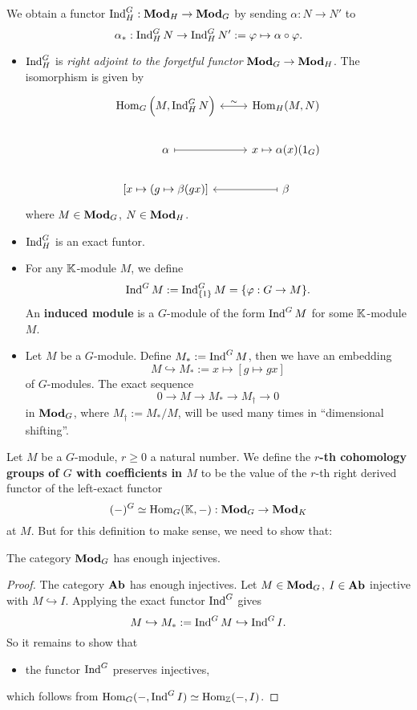 \begin{example}
\begin{enumerate}[(a)]
    We obtain a functor $\operatorname{Ind}_H^G : \mathbf{Mod}_H\to\mathbf{Mod}_G$ by sending $\alpha : N\to N'$ to \[\alpha_* : \operatorname{Ind}_H^G N\to\operatorname{Ind}_H^G N' := \varphi\mapsto\alpha\circ\varphi.\]
    \begin{itemize}
        \item $\operatorname{Ind}_H^G$ is \textit{right adjoint to the forgetful functor} $\mathbf{Mod}_G\to\mathbf{Mod}_H$. The isomorphism is given by
        \[\begin{tikzcd}
            {\Hom_G\left(M, \Ind_H^GN\right)} & {\Hom_H(M, N)} \\
            \alpha & {x\mapsto \alpha(x)(1_G)} \\
            {\left[ x\mapsto (g\mapsto \beta(gx) \right]} & \beta
            \arrow["\sim", leftrightarrow, from=1-1, to=1-2]
            \arrow[maps to, from=2-1, to=2-2]
            \arrow[maps to, from=3-2, to=3-1]
        \end{tikzcd}\]
        where $M\in \mathbf{Mod}_G$, $N\in \mathbf{Mod}_H$.
        \item $\operatorname{Ind}_H^G$ is an exact funtor.
        \item For any $\mathbb{K}$-module $M$, we define \[\operatorname{Ind}^G M := \operatorname{Ind}_{\{1\}}^G M =\{\varphi : G\to M\}.\] An \textbf{induced module} is a $G$-module of the form $\operatorname{Ind}^GM$ for some $\mathbb{K}$-module $M$.
        \item Let $M$ be a $G$-module. Define $M_* := \operatorname{Ind}^G M$, then we have an embedding \[M\hookrightarrow M_* := x \mapsto [g\mapsto gx]\]of $G$-modules. The exact sequence \begin{equation}
            0\to M\to M_*\to M_\dagger \to 0
        \end{equation} in $\mathbf{Mod}_G$, where $M_\dagger := M_*/M$, will be used many times in ``dimensional shifting''.
    \end{itemize}
\end{enumerate}
\end{example}

Let $M$ be a $G$-module, $r\ge 0$ a natural number.
We define the \textbf{ $r$-th cohomology groups of $G$ with coefficients in $M$} to be the value of the $r$-th right derived functor of the left-exact functor \[(-)^G\simeq \operatorname{Hom}_G(\mathbb{K}, -) : \mathbf{Mod}_G\to\mathbf{Mod}_K\] at $M$.
But for this definition to make sense, we need to show that:
\begin{lemma}\label{Mod G has enough injectives}
    The category $\mathbf{Mod}_G$ has enough injectives.
\end{lemma}
\begin{proof}
    The category $\mathbf{Ab}$ has enough injectives. Let $M \in\mathbf{Mod}_G$, $I\in\mathbf{Ab}$ injective with $M\hookrightarrow I$. Applying the exact functor $\operatorname{Ind}^G$ gives \[M\hookrightarrow M_* := \operatorname{Ind}^G M \hookrightarrow\operatorname{Ind}^G I. \] So it remains to show that
    \begin{itemize}
        \item the functor $\operatorname{Ind}^G$ preserves injectives,
    \end{itemize}
    which follows from $\operatorname{Hom}_G(-, \operatorname{Ind}^G I)\simeq\operatorname{Hom}_{\mathbb{Z}}(-, I)$.
\end{proof}


